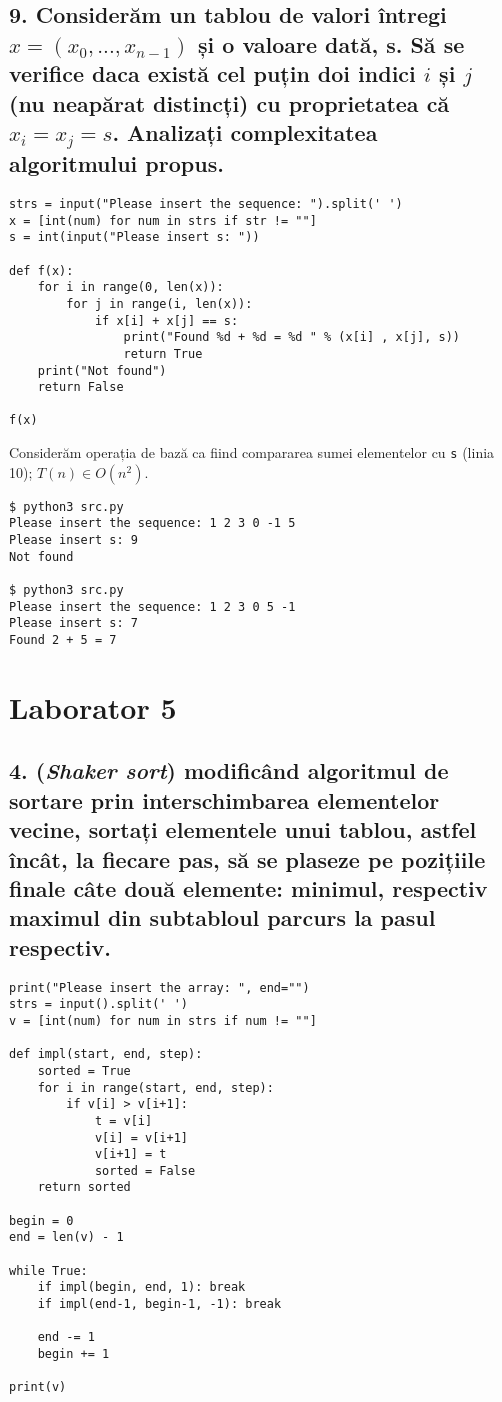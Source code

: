 \documentclass[11pt]{article}
\begin{document}
\subsection*{9. Considerăm un tablou de valori întregi \(x = (x_0, ..., x_{n-1})\) și o valoare dată, s. Să se verifice daca există cel puțin doi indici \(i\) și \(j\) (nu neapărat distincți) cu proprietatea că \(x_i = x_j = s\). Analizați complexitatea algoritmului propus.}
\label{sec:org5178284}

\begin{verbatim}
strs = input("Please insert the sequence: ").split(' ')
x = [int(num) for num in strs if str != ""]
s = int(input("Please insert s: "))

def f(x):
    for i in range(0, len(x)):
        for j in range(i, len(x)):
            if x[i] + x[j] == s:
                print("Found %d + %d = %d " % (x[i] , x[j], s))
                return True
    print("Not found")
    return False

f(x)
\end{verbatim}
Considerăm operația de bază ca fiind compararea sumei elementelor cu \texttt{s} (linia 10);
$T(n) \in O(n^2)$.
\begin{verbatim}
$ python3 src.py
Please insert the sequence: 1 2 3 0 -1 5
Please insert s: 9
Not found

$ python3 src.py
Please insert the sequence: 1 2 3 0 5 -1
Please insert s: 7
Found 2 + 5 = 7 
\end{verbatim}

\pagebreak
\section*{Laborator 5}
\label{sec:org5b21128}
\subsection*{4. (\textit{Shaker sort}) modificând algoritmul de sortare prin interschimbarea elementelor vecine, sortați elementele unui tablou, astfel încât, la fiecare pas, să se plaseze pe pozițiile finale câte două elemente: minimul, respectiv maximul din subtabloul parcurs la pasul respectiv.}
\label{sec:org0fa6c32}

\begin{verbatim}
print("Please insert the array: ", end="")
strs = input().split(' ')
v = [int(num) for num in strs if num != ""]

def impl(start, end, step):
    sorted = True
    for i in range(start, end, step):
        if v[i] > v[i+1]:
            t = v[i]
            v[i] = v[i+1]
            v[i+1] = t
            sorted = False
    return sorted

begin = 0
end = len(v) - 1

while True:
    if impl(begin, end, 1): break
    if impl(end-1, begin-1, -1): break

    end -= 1
    begin += 1

print(v)

\end{verbatim}
\end{document}
